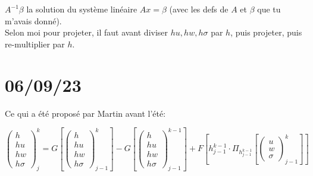 \documentclass[review,onefignum,onetabnum]{siamart220329}
\begin{document}
$A^{-1} \beta$ la solution du système linéaire $Ax = \beta$ (avec les defs de $A$ et $\beta$ que tu m'avais donné).\\
Selon moi pour projeter, il faut avant diviser $hu, hw, h\sigma$ par $h$, puis projeter, puis re-multiplier par $h$.

\section{06/09/23}

Ce qui a été proposé par Martin avant l'été:

\begin{equation}
    \begin{pmatrix}
        h \\ hu \\ hw \\ h\sigma
    \end{pmatrix}^{k}_{j} =
    G\left[
        \begin{pmatrix}
            h \\ hu \\ hw \\ h\sigma
        \end{pmatrix}^{k}_{j-1}
    \right]
    - G\left[
        \begin{pmatrix}
            h \\ hu \\ hw \\ h\sigma
        \end{pmatrix}^{k-1}_{j-1}
    \right]
    + F\left[ h^{k-1}_{j-1} \cdot \Pi_{h^{k-1}_{j-1}} \left[
        \begin{pmatrix}
            u \\ w \\ \sigma
        \end{pmatrix}^{k}_{j-1}
        \right]
    \right]
\end{equation}
\end{document}
